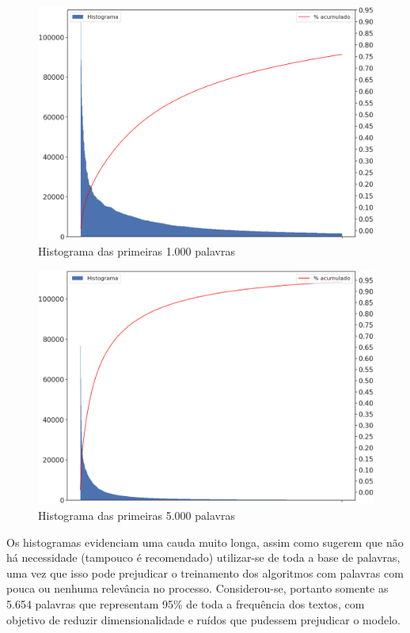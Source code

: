 \documentclass[twocolumn]{rbef}
\newcommand{\1}{\mathbbm{1}}
\begin{document}
\begin{figure}[!htb]
  \includegraphics[scale=0.23]{5. Histograma das 1000 primeiras palavras.png}
  \caption{Histograma das primeiras 1.000 palavras}
  \label{fig5}
\end{figure}
\begin{figure}[!htb]
  \includegraphics[scale=0.23]{6. Histograma das 5000 primeiras palavras.png}
  \caption{Histograma das primeiras 5.000 palavras}
  \label{fig6}
\end{figure}
\newline\linebreak Os histogramas evidenciam uma cauda muito longa, assim como sugerem que não há necessidade (tampouco é recomendado) utilizar-se de toda a base de palavras, uma vez que isso pode prejudicar o treinamento dos algoritmos com palavras com pouca ou nenhuma relevância no processo. Considerou-se, portanto somente as 5.654 palavras que representam 95\% de toda a frequência dos textos, com objetivo de reduzir dimensionalidade e ruídos que pudessem prejudicar o modelo.
\end{document}
